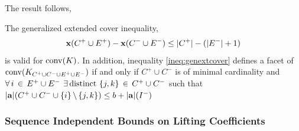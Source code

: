 \documentclass[10pt,twoside]{amsart}
\begin{document}
The result follows,

\begin{prop}
\label{prop:genextcover}
  The generalized extended cover inequality,
  \begin{align}
    \label{ineq:genextcover}
    \mathbf{x}(C^+\cup E^+) - \mathbf{x}(C^-\cup E^-) \leq |C^+| - (|E^-| + 1)
  \end{align}
  is valid for $\operatorname{conv}(K)$. In addition, inequality \eqref{ineq:genextcover} defines a facet of $\operatorname{conv}(K_{C^+\cup C^-\cup E^+ \cup E^-})$ if and only if $C^+\cup C^-$ is of minimal cardinality and $\forall\, i\,\in\, E^+\cup E^-$ $\exists\, \text{distinct }\{j,k\}\,\in\, C^+\cup C^-$ such that $|\mathbf{a}|(C^+\cup C^- \cup \{i\} \,\backslash\, \{j,k\}) \leq b + |\mathbf{a}|(I^-)$
\end{prop}

\subsubsection{Sequence Independent Bounds on Lifting Coefficients}\hfill
\end{document}
